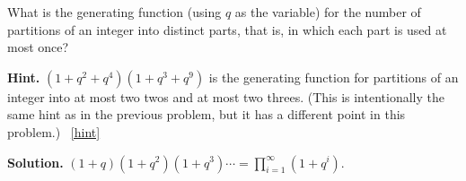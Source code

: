 \documentclass{book}
\begin{document}
\setcounter{project}{322}
\addtocounter{project}{-1}
\begin{activity}[]\label{activity-315}
\hypertarget{p-1626}{}%
What is the generating function (using \(q\) as the variable) for the number of partitions of an integer into distinct parts, that is, in which each part is used at most once?%
\par\smallskip%
\noindent\textbf{Hint.}\hypertarget{hint-213}{}\quad%
\hypertarget{p-1627}{}%
\((1 + q^2 + q^4 )(1 + q^3 + q^9 )\) is the generating function for partitions of an integer into at most two twos and at most two threes. (This is intentionally the same hint as in the previous problem, but it has a different point in this problem.)%
~\hfill{\tiny\hyperlink{a-322}{[hint]}\hypertarget{q-322}{}}\par\smallskip%
\noindent\textbf{Solution.}\hypertarget{solution-230}{}\quad%
\hypertarget{p-1628}{}%
\(\displaystyle (1+q)(1+q^2)(1+q^3)\cdots=
\prod_{i=1}^\infty(1+q^i)\).%
\end{activity}
\end{document}
